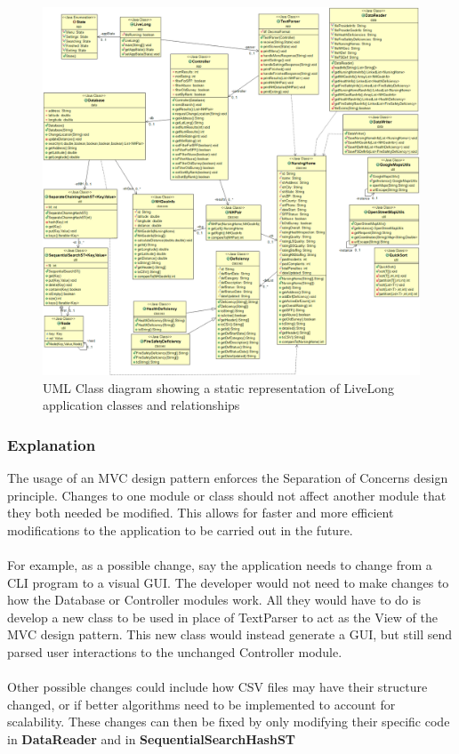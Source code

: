 \documentclass[12pt]{article}
\begin{document}
\begin{center}
\begin{figure}
\includegraphics[width=16cm]{Pictures/uml.png}
\caption{UML Class diagram showing a static representation of LiveLong application classes and relationships}
\label{fig:ClassUML}
\end{figure}
\end{center}

\subsubsection{Explanation}
The usage of an MVC design pattern enforces the Separation of Concerns design principle. Changes to one module or class should not affect another module that they both needed be modified. This allows for faster and more efficient modifications to the application to be carried out in the future.
\\ \\
For example, as a possible change, say the application needs to change from a CLI program to a visual GUI. The developer would not need to make changes to how the Database or Controller modules work. All they would have to do is develop a new class to be used in place of TextParser to act as the View of the MVC design pattern. This new class would instead generate a GUI, but still send parsed user interactions to the unchanged Controller module.
\\ \\
Other possible changes could include how CSV files may have their structure changed, or if better algorithms need to be implemented to account for scalability. These changes can then be fixed by only modifying their specific code in \textbf{DataReader} and in \textbf{SequentialSearchHashST}
\newpage
\end{document}
